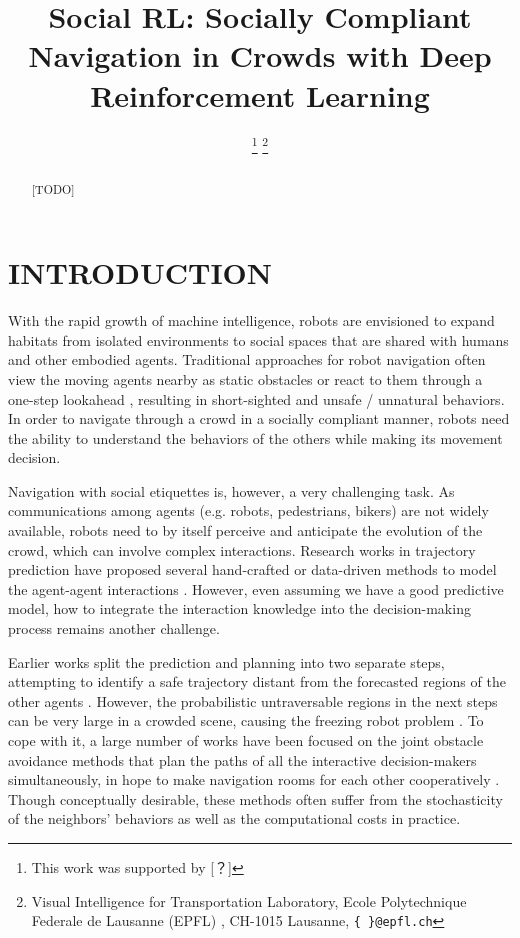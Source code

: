\documentclass[letterpaper, 10 pt, conference]{ieeeconf}  %
\title{\Large \bf Social RL: Socially Compliant Navigation in Crowds
with Deep Reinforcement Learning}
\author{%
\thanks{This work was supported by [？]}%
\thanks{Visual Intelligence for Transportation Laboratory, Ecole Polytechnique Federale de Lausanne (EPFL)
, CH-1015 Lausanne,
        {\tt\small \{ \}@epfl.ch}}%
}
\begin{document}

\maketitle
\thispagestyle{empty}
\pagestyle{empty}

\begin{abstract}
[TODO]
\vspace{3cm}

\end{abstract}


\section{INTRODUCTION} \label{sec:intro}

With the rapid growth of machine intelligence, robots are envisioned to expand habitats from isolated environments to social spaces that are shared with humans and other embodied agents. Traditional approaches for robot navigation often view the moving agents nearby as static obstacles \cite{fox_dynamic_1997} or react to them through a one-step lookahead \cite{berg_reciprocal_2008}, resulting in short-sighted and unsafe / unnatural behaviors. In order to navigate through a crowd in a socially compliant manner, robots need the ability to understand the behaviors of the others while making its movement decision. 

Navigation with social etiquettes is, however, a very challenging task. As communications among agents (e.g. robots, pedestrians, bikers) are not widely available, robots need to by itself perceive and anticipate the evolution of the crowd, which can involve complex interactions. Research works in trajectory prediction have proposed several hand-crafted or data-driven methods to model the agent-agent interactions \cite{helbing_social_1995,alahi_social_2016,vemula_social_2017,gupta_social_2018}. However, even assuming we have a good predictive model, how to integrate the interaction knowledge into the decision-making process remains another challenge. 

Earlier works split the prediction and planning into two separate steps, attempting to identify a safe trajectory distant from the forecasted regions of the other agents \cite{bennewitz_learning_2005,aoude_probabilistically_2013}. However, the probabilistic untraversable regions in the next steps can be very large in a crowded scene, causing the freezing robot problem \cite{trautman_unfreezing_2010}. To cope with it, a large number of works have been focused on the joint obstacle avoidance methods that plan the paths of all the interactive decision-makers simultaneously, in hope to make navigation rooms for each other cooperatively \cite{trautman_unfreezing_2010}. Though conceptually desirable, these methods often suffer from the stochasticity of the neighbors' behaviors as well as the computational costs in practice. 
\end{document}
